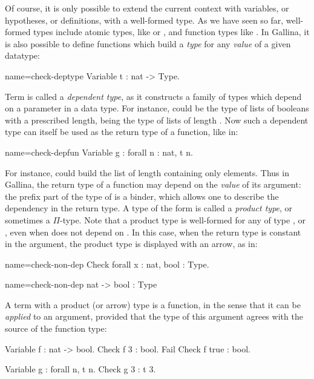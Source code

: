 Of course, it is only possible to extend the current context with variables, or
hypotheses, or definitions, with a well-formed type. As we have seen
so far, well-formed types include atomic types, like  or
, and function types like . In Gallina, it is
also possible to define functions which build a \emph{type} for any
\emph{value} of a given datatype:
\begin{coq}{name=check-deptype}{}
Variable t : nat -> Type.
\end{coq}

Term  is called a \emph{dependent type}, as it constructs a
family of types which depend on a parameter in a data type. For
instance,  could be the type of lists of booleans with a
prescribed length,  being the type of lists of length
. Now such a dependent type can itself be used as the return type
of a function, like in: 

\begin{coq}{name=check-depfun}{}
Variable g : forall n : nat, t n.
\end{coq}

For instance,  could build the list of length  containing
only  elements.
Thus in Gallina, the return type of a function may depend on the
\emph{value} of its argument: the prefix  part of the
type of  is a binder, which allows one to describe the dependency in
the return type. A type of the form  is called a
\emph{product type}, or sometimes a $\Pi$-type. Note that a product
type  is well-formed for any  of type ,
 or , even when  does not depend on . In this
case, when the return type is constant in the argument, the product
type is displayed with an arrow, as in:

\begin{coq-left}{name=check-non-dep}{}
Check forall x : nat, bool : Type.
\end{coq-left}
\begin{coqout-right}{name=check-non-dep}{}
nat -> bool : Type
\end{coqout-right}
  
A term with a product (or arrow) type is a function, in the sense that
it can be \emph{applied} to an argument, provided that the type of
this argument agrees with the source of the function type:

\begin{coq}{}{}
Variable f : nat -> bool.
Check f 3 : bool.
Fail Check f true : bool.

Variable g : forall n, t n.
Check g 3 : t 3.
\end{coq}

